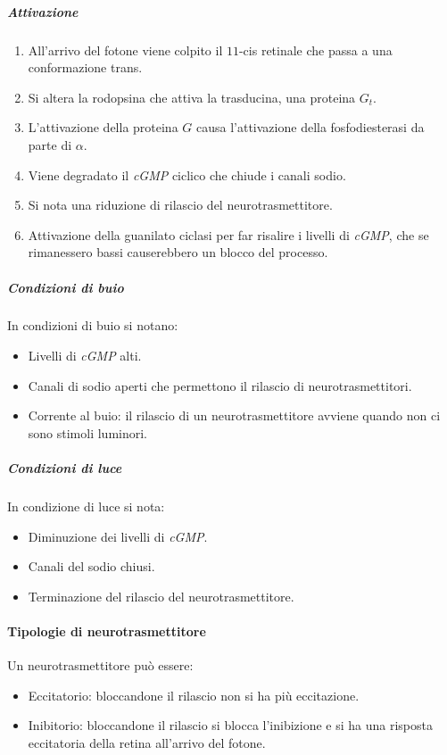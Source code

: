 				\subparagraph{Attivazione}
				\begin{multicols}{2}
					\begin{enumerate}
						\item All'arrivo del fotone viene colpito il $11$-cis retinale che passa a una conformazione trans.
						\item Si altera la rodopsina che attiva la trasducina, una proteina $G_t$.
						\item L'attivazione della proteina $G$ causa l'attivazione della fosfodiesterasi da parte di $\alpha$.
						\item Viene degradato il \emph{cGMP} ciclico che chiude i canali sodio.
						\item Si nota una riduzione di rilascio del neurotrasmettitore.
						\item Attivazione della guanilato ciclasi per far risalire i livelli di \emph{cGMP}, che se rimanessero bassi causerebbero un blocco del processo.
					\end{enumerate}
				\end{multicols}

				\subparagraph{Condizioni di buio}
				In condizioni di buio si notano:
				\begin{multicols}{2}
					\begin{itemize}
						\item Livelli di \emph{cGMP} alti.
						\item Canali di sodio aperti che permettono il rilascio di neurotrasmettitori.
						\item Corrente al buio: il rilascio di un neurotrasmettitore avviene quando non ci sono stimoli luminori.
					\end{itemize}
				\end{multicols}

				\subparagraph{Condizioni di luce}
				In condizione di luce si nota:
				\begin{multicols}{2}
					\begin{itemize}
						\item Diminuzione dei livelli di \emph{cGMP}.
						\item Canali del sodio chiusi.
						\item Terminazione del rilascio del neurotrasmettitore.
					\end{itemize}
				\end{multicols}

			\paragraph{Tipologie di neurotrasmettitore}
			Un neurotrasmettitore pu\`o essere:
			\begin{multicols}{2}
				\begin{itemize}
					\item Eccitatorio: bloccandone il rilascio non si ha pi\`u eccitazione.
					\item Inibitorio: bloccandone il rilascio si blocca l'inibizione e si ha una risposta eccitatoria della retina all'arrivo del fotone.
				\end{itemize}
			\end{multicols}

